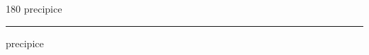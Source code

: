 
\begin{frame}
\begin{center}
\begin{turn}{180}
{\fontsize{2.5cm}{1em}\selectfont precipice}
\end{turn}
\vspace{1em}\par  
\hrule
\vspace{1em}\par  
{\fontsize{2.5cm}{1em}\selectfont precipice}
\end{center}
\end{frame}
